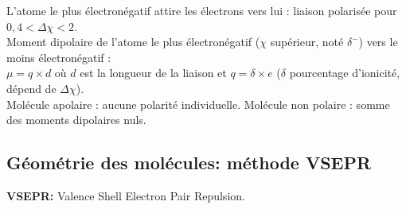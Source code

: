 \documentclass{article}
\begin{document}
L'atome le plus électronégatif attire les électrons vers lui : liaison polarisée pour $0,4 < \Delta\chi < 2$.\\
Moment dipolaire de l'atome le plus électronégatif ($\chi$ supérieur, noté $\delta^-$) vers le moins électronégatif :\\
$\mu = q \times d$ où $d$ est la longueur de la liaison et $q = \delta \times e$ ($\delta$ pourcentage d'ionicité, dépend de $\Delta \chi$).\\
Molécule apolaire : aucune polarité individuelle.
Molécule non polaire : somme des moments dipolaires nuls.


\newpage

\subsection{Géométrie des molécules: méthode VSEPR}

\vspace{5mm}

\textbf{VSEPR:} Valence Shell Electron Pair Repulsion.
\end{document}
